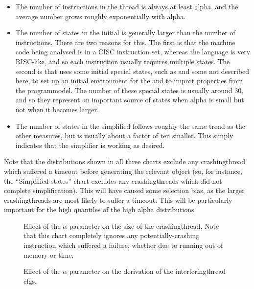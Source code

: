 \begin{itemize}
\item The number of instructions in the thread is always at least
  \gls{alpha}, and the average number grows roughly exponentially with
  \gls{alpha}.
\item The number of states in the initial {\StateMachine} is generally
  larger than the number of instructions.  There are two reasons for
  this.  The first is that the machine code being analysed is in a
  CISC instruction set, whereas the {\StateMachine} language is very
  RISC-like, and so each instruction usually requires multiple states.
  The second is that {\implementation} uses some initial special
  states, such as  and some not described here,
  to set up an initial environment for the {\StateMachine} and to
  import properties from the \gls{programmodel}.  The number of these
  special states is usually around 30, and so they represent an
  important source of states when \gls{alpha} is small but not when it
  becomes larger.
\item The number of states in the simplified {\StateMachine} follows
  roughly the same trend as the other measures, but is usually about a
  factor of ten smaller.  This simply indicates that the simplifier is
  working as desired.
\end{itemize}

Note that the distributions shown in all three charts exclude any
\gls{crashingthread} which suffered a timeout before generating the
relevant object (so, for instance, the ``Simplified states'' chart
excludes any \glspl{crashingthread} which did not complete
simplification).  This will have caused some selection bias, as the
larger \glspl{crashingthread} are most likely to suffer a timeout.
This will be particularly important for the high quantiles of the high
\gls{alpha} distributions.

\begin{figure}
  \centerline{}
  \caption{Effect of the $\alpha$ parameter on the size of the
    \gls{crashingthread}.  Note that this chart completely ignores any
    potentially-crashing instruction which suffered a failure, whether
    due to running out of memory or time.}
  \label{fig:eval:time_breakdown:crashing_size}
\end{figure}

\begin{figure}
  
  \caption{Effect of the $\alpha$ parameter on the derivation of the
    \gls{interferingthread} \glspl{cfg}.}
  \label{fig:perf:alpha:gsc:unopt}
\end{figure}

